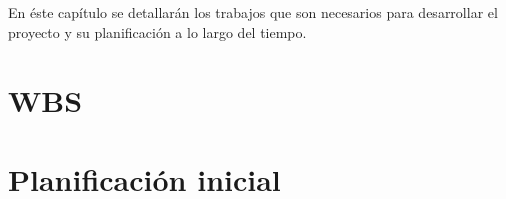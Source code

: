 En éste capítulo se detallarán los trabajos que son necesarios para desarrollar el proyecto y su planificación a lo largo del tiempo.

\section{WBS}
\label{planificacion:wbs}


\section{Planificación inicial}
\label{planificacion:inicial}
